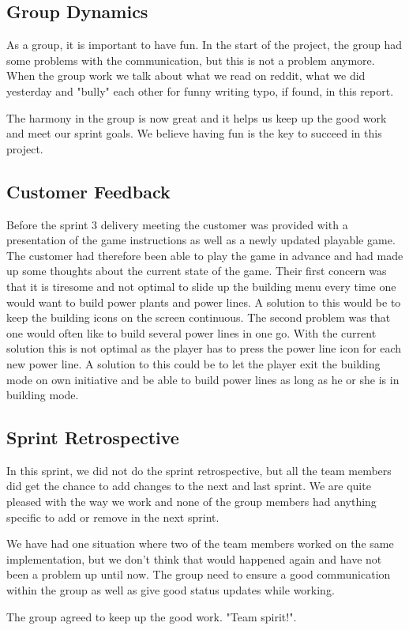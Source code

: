 \subsection{Group Dynamics}
	As a group, it is important to have fun. In the start of the project, the group had some
	problems with the communication, but this is not a problem anymore.
	When the group work we talk about what we read on reddit, what we did yesterday and 
	"bully" each other for funny writing typo, if found, in this report. 

	The harmony in the group is now great and it helps us keep up the good work and meet 
	our sprint goals. We believe having fun is the key to succeed in this project. 

\subsection{Customer Feedback}

	Before the sprint 3 delivery meeting the customer was provided with a presentation 
	of the game instructions as well as a newly updated playable game. The customer had 
	therefore been able to play the game in advance and had made up some thoughts about 
	the current state of the game. Their first concern was that it is tiresome and not 
	optimal to slide up the building menu every time one would want to build power plants 
	and power lines. A solution to this would be to keep the building icons on the screen 
	continuous. The second problem was that one would often like to build several power 
	lines in one go. With the current solution this is not optimal as the player has to 
	press the power line icon for each new power line. A solution to this could be to let 
	the player exit the building mode on own initiative and be able to build power lines as 
	long as he or she is in building mode.

\subsection{Sprint Retrospective}
	In this sprint, we did not do the sprint retrospective, but all the team members did
	get the chance to add changes to the next and last sprint. We are quite pleased with the way 
	we work and none of the group members had anything specific to add or remove in the next sprint.

	We have had one situation where two of the team members worked on the same implementation, 
	but we don't think that would happened again and have not been a problem up until now. 
	The group need to ensure a good communication within the group as well as give good status
	updates while working. 

	The group agreed to keep up the good work. "Team spirit!".
